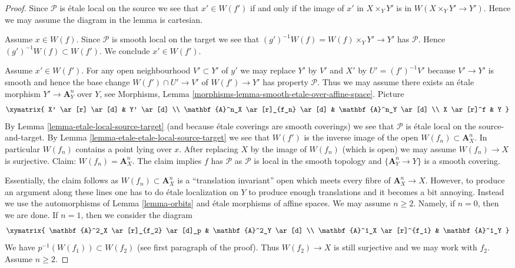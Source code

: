 \begin{proof}
Since $\mathcal{P}$ is \'etale local on the source we see
that $x' \in W(f')$ if and only if the image of $x'$ in
$X \times_Y Y'$ is in $W(X \times_Y Y' \to Y')$. Hence we
may assume the diagram in the lemma is cartesian.

\medskip\noindent
Assume $x \in W(f)$. Since $\mathcal{P}$ is smooth local on the target
we see that $(g')^{-1}W(f) = W(f) \times_Y Y' \to Y'$ has $\mathcal{P}$.
Hence $(g')^{-1}W(f) \subset W(f')$. We conclude $x' \in W(f')$.

\medskip\noindent
Assume $x' \in W(f')$.
For any open neighbourhood $V' \subset Y'$ of $y'$ we may replace
$Y'$ by $V'$ and $X'$ by $U' = (f')^{-1}V'$ because $V' \to Y'$ is smooth
and hence the base change $W(f') \cap U' \to V'$ of $W(f') \to Y'$
has property $\mathcal{P}$. Thus we may assume there exists
an \'etale morphism $Y' \to \mathbf{A}^n_Y$ over $Y$, see
Morphisms, Lemma \ref{morphisms-lemma-smooth-etale-over-affine-space}.
Picture
$$
\xymatrix{
X' \ar[r] \ar[d] & Y' \ar[d] \\
\mathbf{A}^n_X \ar[r]_{f_n} \ar[d] & \mathbf{A}^n_Y \ar[d] \\
X \ar[r]^f & Y
}
$$
By Lemma \ref{lemma-etale-local-source-target}
(and because \'etale coverings are smooth coverings)
we see that $\mathcal{P}$ is \'etale local on the source-and-target.
By Lemma \ref{lemma-etale-etale-local-source-target}
we see that $W(f')$ is the inverse image of
the open $W(f_n) \subset \mathbf{A}^n_X$. In particular
$W(f_n)$ contains a point lying over $x$.
After replacing $X$ by the image of $W(f_n)$ (which is open)
we may assume $W(f_n) \to X$ is surjective.
Claim: $W(f_n) = \mathbf{A}^n_X$.
The claim implies $f$ has $\mathcal{P}$ as
$\mathcal{P}$ is local in the smooth topology
and $\{\mathbf{A}^n_Y \to Y\}$ is a smooth covering.

\medskip\noindent
Essentially, the claim follows as $W(f_n) \subset \mathbf{A}^n_X$ is a
``translation invariant'' open which meets every fibre of
$\mathbf{A}^n_X \to X$. However, to produce an argument along these lines
one has to do \'etale localization on $Y$ to produce enough translations
and it becomes a bit annoying. Instead we use the automorphisms
of Lemma \ref{lemma-orbits} and \'etale morphisms of affine spaces.
We may assume $n \geq 2$. Namely, if $n = 0$, then we are done.
If $n = 1$, then we consider the diagram
$$
\xymatrix{
\mathbf{A}^2_X \ar[r]_{f_2} \ar[d]_p & \mathbf{A}^2_Y \ar[d] \\
\mathbf{A}^1_X \ar[r]^{f_1} & \mathbf{A}^1_Y
}
$$
We have $p^{-1}(W(f_1)) \subset W(f_2)$ (see first paragraph
of the proof). Thus $W(f_2) \to X$ is still surjective
and we may work with $f_2$. Assume $n \geq 2$.


\end{proof}
